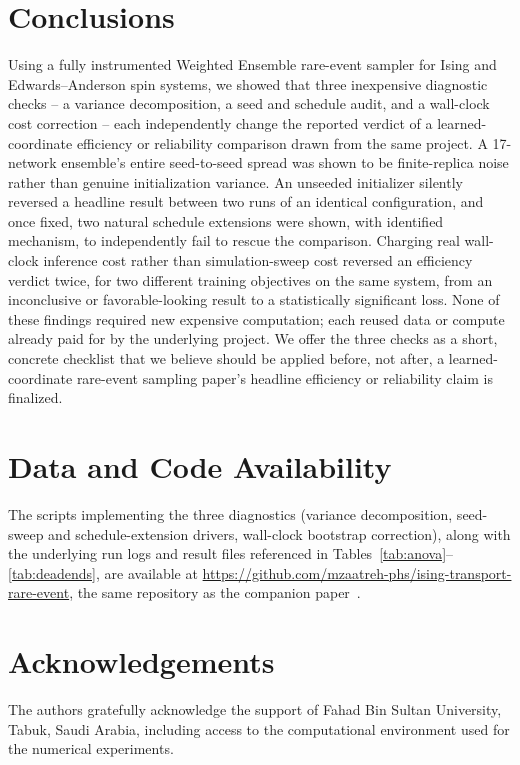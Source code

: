 \documentclass[a4paper,fleqn]{cas-sc}
\begin{document}
\section{Conclusions}\label{sec:conclusions}

Using a fully instrumented Weighted Ensemble rare-event sampler for Ising
and Edwards--Anderson spin systems, we showed that three inexpensive
diagnostic checks -- a variance decomposition, a seed and schedule audit,
and a wall-clock cost correction -- each independently change the reported
verdict of a learned-coordinate efficiency or reliability comparison drawn
from the same project. A 17-network ensemble's entire seed-to-seed spread
was shown to be finite-replica noise rather than genuine initialization
variance. An unseeded initializer silently reversed a headline result
between two runs of an identical configuration, and once fixed, two natural
schedule extensions were shown, with identified mechanism, to independently
fail to rescue the comparison. Charging real wall-clock inference cost
rather than simulation-sweep cost reversed an efficiency verdict twice, for
two different training objectives on the same system, from an inconclusive
or favorable-looking result to a statistically significant loss. None of
these findings required new expensive computation; each reused data or
compute already paid for by the underlying project. We offer the three
checks as a short, concrete checklist that we believe should be applied
before, not after, a learned-coordinate rare-event sampling paper's headline
efficiency or reliability claim is finalized.

\section*{Data and Code Availability}
The scripts implementing the three diagnostics (variance decomposition,
seed-sweep and schedule-extension drivers, wall-clock bootstrap correction),
along with the underlying run logs and result files referenced in
Tables~\ref{tab:anova}--\ref{tab:deadends}, are available at
\url{https://github.com/mzaatreh-phs/ising-transport-rare-event}, the same
repository as the companion paper~\citep{alzaatreh2026}.

\section*{Acknowledgements}
The authors gratefully acknowledge the support of Fahad Bin Sultan
University, Tabuk, Saudi Arabia, including access to the computational
environment used for the numerical experiments.
\end{document}

